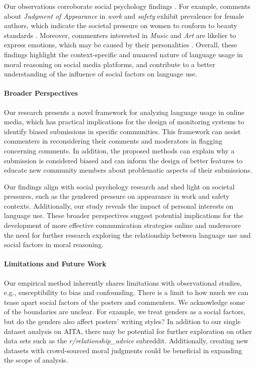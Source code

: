 \documentclass[letterpaper]{article} %
\begin{document}
Our observations corroborate social psychology findings \cite{csik-1973-personality, stuart-2012-choosing}.
For example, comments about \textsl{Judgment of Appearance} in \textsl{work} and \textsl{safety} exhibit prevalence for female authors, which indicate the societal pressure on women to conform to beauty standards \cite{stuart-2012-choosing}.
Moreover, commenters interested in \textsl{Music} and \textsl{Art} are likelier to express emotions, which may be caused by their personalities \cite{csik-1973-personality}.
Overall, these findings highlight the context-specific and nuanced nature of language usage in moral reasoning on social media platforms, and contribute to a better understanding of the influence of social factors on language use.


\paragraph{Broader Perspectives}

Our research presents a novel framework for analyzing language usage in online media, which has practical implications for the design of monitoring systems to identify biased submissions in specific communities. 
This framework can assist commenters in reconsidering their comments and moderators in flagging concerning comments. 
In addition, the proposed methods can explain why a submission is considered biased and can inform the design of better features to educate new community members about problematic aspects of their submissions. 

Our findings align with social psychology research and shed light on societal pressures, such as the gendered pressure on appearance in work and safety contexts. 
Additionally, our study reveals the impact of personal interests on language use. 
These broader perspectives suggest potential implications for the development of more effective communication strategies online and underscore the need for further research exploring the relationship between language use and social factors in moral reasoning.

\paragraph{Limitations and Future Work}

Our empirical method inherently shares limitations with observational studies, e.g., susceptibility to bias and confounding.
There is a limit to how much we can tease apart social factors of the posters and commenters. 
We acknowledge some of the boundaries are unclear. 
For example, we treat genders as a social factors, but do the genders also affect posters' writing styles?
In addition to our single dataset analysis on AITA, there may be potential for further exploration on other data sets such as the \textsl{r/relationship\_advice} subreddit. 
Additionally, creating new datasets with crowd-sourced moral judgments could be beneficial in expanding the scope of analysis.
\end{document}
